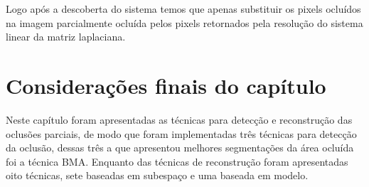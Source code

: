  Logo após a descoberta do sistema temos que apenas substituir os pixels ocluídos na imagem parcialmente ocluída pelos pixels retornados pela resolução do sistema linear da matriz laplaciana.




\section{Considerações finais do capítulo}

Neste capítulo foram apresentadas as técnicas para detecção e reconstrução das oclusões parciais, de modo que foram implementadas três técnicas para detecção da oclusão, dessas três a que apresentou melhores segmentações da área ocluída foi a técnica BMA. Enquanto das técnicas de reconstrução foram apresentadas oito técnicas, sete baseadas em subespaço e uma baseada em modelo.

